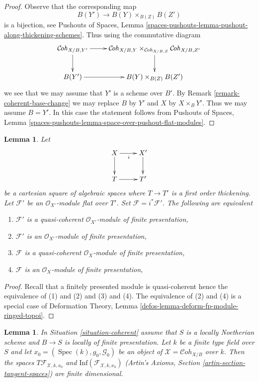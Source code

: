 \documentclass{stacks-project}
\theoremstyle{plain}
\newtheorem{lemma}[subsection]{Lemma}
\theoremstyle{definition}
\theoremstyle{remark}
\numberwithin{equation}{subsection}
\def\Spec{\mathop{\mathrm{Spec}}}
\def\Cohstack{\mathcal{C}\!\mathit{oh}}
\begin{document}
\begin{proof}
Observe that the corresponding map
$$
B(Y') \longrightarrow B(Y) \times_{B(Z)} B(Z')
$$
is a bijection, see Pushouts of Spaces, Lemma
\ref{spaces-pushouts-lemma-pushout-along-thickening-schemes}.
Thus using the commutative diagram
$$
\xymatrix{
\Cohstack_{X/B, Y'} \ar[r] \ar[d] &
\Cohstack_{X/B, Y} \times_{\Cohstack_{X/B, Z}} \Cohstack_{X/B, Z'}
\ar[d] \\
B(Y') \ar[r] & B(Y) \times_{B(Z)} B(Z')
}
$$
we see that we may assume that $Y'$ is a scheme over $B'$. By
Remark \ref{remark-coherent-base-change}
we may replace $B$ by $Y'$ and $X$ by $X \times_B Y'$.
Thus we may assume $B = Y'$. In this case the statement follows from
Pushouts of Spaces, Lemma
\ref{spaces-pushouts-lemma-space-over-pushout-flat-modules}.
\end{proof}

\begin{lemma}
\label{lemma-coherent-over-first-order-thickening}
Let
$$
\xymatrix{
X \ar[d] \ar[r]_i & X' \ar[d] \\
T \ar[r] & T'
}
$$
be a cartesian square of algebraic spaces where $T \to T'$ is a first
order thickening. Let $\mathcal{F}'$ be an $\mathcal{O}_{X'}$-module
flat over $T'$. Set $\mathcal{F} = i^*\mathcal{F}'$. The following
are equivalent
\begin{enumerate}
\item $\mathcal{F}'$ is a quasi-coherent $\mathcal{O}_{X'}$-module
of finite presentation,
\item $\mathcal{F}'$ is an $\mathcal{O}_{X'}$-module of finite presentation,
\item $\mathcal{F}$ is a quasi-coherent $\mathcal{O}_X$-module
of finite presentation,
\item $\mathcal{F}$ is an $\mathcal{O}_X$-module of finite presentation,
\end{enumerate}
\end{lemma}

\begin{proof}
Recall that a finitely presented module is quasi-coherent hence the
equivalence of (1) and (2) and (3) and (4). The equivalence of (2)
and (4) is a special case of Deformation Theory, Lemma
\ref{defos-lemma-deform-fp-module-ringed-topoi}.
\end{proof}

\begin{lemma}
\label{lemma-coherent-tangent-space}
In Situation \ref{situation-coherent} assume that $S$ is a locally Noetherian
scheme and $B \to S$ is locally of finite presentation.
Let $k$ be a finite type field over $S$ and let
$x_0 = (\Spec(k), g_0, \mathcal{G}_0)$
be an object of $\mathcal{X} = \Cohstack_{X/B}$ over $k$. Then
the spaces $T\mathcal{F}_{\mathcal{X}, k, x_0}$ and
$\text{Inf}(\mathcal{F}_{\mathcal{X}, k, x_0})$
(Artin's Axioms, Section \ref{artin-section-tangent-spaces})
are finite dimensional.
\end{lemma}
\end{document}

